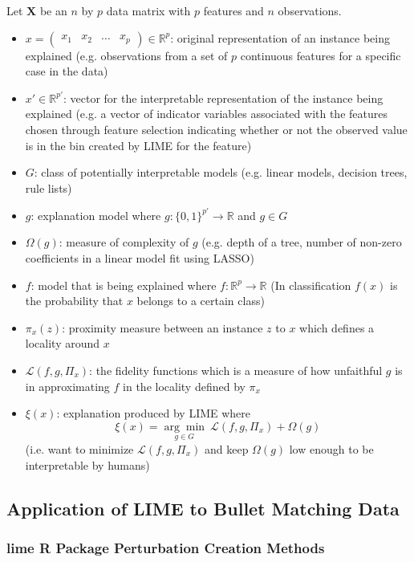 \documentclass[AMS,STIX2COL]{WileyNJD-v2}
\begin{document}
Let $\textbf{X}$ be an $n$ by $p$ data matrix with $p$ features and $n$ observations.

\begin{itemize}
\item $x=\left(\begin{array}{cccc}x_1 & x_2 & \hdots & x_p\end{array}\right)\in\mathbb{R}^p$: original representation of an instance being explained (e.g. observations from a set of $p$ continuous features for a specific case in the data) %
\item $x'\in\mathbb{R}^{p'}$: vector for the interpretable representation of the instance being explained (e.g. a vector of indicator variables associated with the features chosen through feature selection indicating whether or not the observed value is in the bin created by LIME for the feature)
\item $G$: class of potentially interpretable models (e.g. linear models, decision trees, rule lists)
\item $g$: explanation model where $g:\{0,1\}^{p'}\rightarrow\mathbb{R}$ and $g\in G$
\item $\Omega(g)$: measure of complexity of $g$ (e.g. depth of a tree, number of non-zero coefficients in a linear model fit using LASSO)
\item $f$: model that is being explained where $f:\mathbb{R}^p\rightarrow\mathbb{R}$ (In classification $f(x)$ is the probability that $x$ belongs to a certain class)
\item $\pi_x(z)$: proximity measure between an instance $z$ to $x$ which defines a locality around $x$
\item $\mathcal{L}(f, g, \Pi_x)$: the fidelity functions which is a measure of how unfaithful $g$ is in approximating $f$ in the locality defined by $\pi_x$
\item $\xi(x)$: explanation produced by LIME where
  $$\xi(x)=\underset{g\in G}{\arg\min} \ \mathcal{L}(f, g, \Pi_x)+\Omega(g)$$
(i.e. want to minimize $\mathcal{L}(f, g, \Pi_x)$ and keep $\Omega(g)$ low enough to be interpretable by humans)
\end{itemize}

\subsection{Application of LIME to Bullet Matching Data}

\subsubsection{lime R Package Perturbation Creation Methods}
\end{document}
